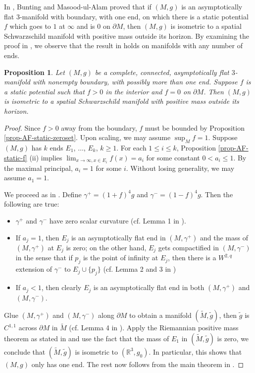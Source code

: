 \documentclass[12pt]{amsart}
\newtheorem{prop}{Proposition}[section]
\theoremstyle{remark}
\numberwithin{equation}{section}
\newcommand{\R}{\mathbb R}
\def\p{\partial}
\begin{document}
In \cite{Bunting-Masood}, Bunting and Masood-ul-Alam  proved that if $(M,g)$ is an
asymptotically flat $3$-manifold with  boundary, with one end,  
on which there is  a static potential  $f $ which goes to $1$ at $\infty$ and is $0$  on $\p M$,
 then $(M, g)$ is isometric to a spatial Schwarzschild manifold with positive mass outside its horizon.
  By examining the proof in \cite{Bunting-Masood}, we observe that the result in \cite{Bunting-Masood} holds on  manifolds with any number of ends.

\begin{prop}\label{prop-B-M}
Let $(M,g)$ be a complete, connected, asymptotically flat $3$-manifold with nonempty   boundary, with possibly more than one end.
Suppose $ f$ is a static potential  such that $f>0$ in the interior and  $f=0$ on $\p M$. Then
$(M, g)$ is isometric to a spatial Schwarzschild manifold with positive mass outside its horizon.
\end{prop}

\begin{proof}
Since $f > 0 $ away from the boundary,  $f$ must be  bounded by Proposition \ref{prop-AF-static-zeroset}.
Upon scaling, we may assume $\sup_M f=1$.
Suppose $(M, g)$ has $k$ ends $E_1$, $\ldots$, $E_k$, $k \ge 1$.
For each $ 1 \le i \le k$,  Proposition \ref{prop-AF-static-f} (ii) implies $\lim_{x\to\infty, x\in E_i}f(x)=a_i$ for some constant $0<a_i\le 1$.
By the maximal principal,  $a_i = 1 $ for some $i$. Without losing generality, we  may  assume  $a_1=1$.


We proceed as in \cite{Bunting-Masood}.  Define  $\gamma^{+}=(1+f)^4g$ and $\gamma^{-}=(1-f)^4g$.
Then the following are true:
\begin{itemize}
\item  $\gamma^+$ and $\gamma^-$ have zero scalar curvature (cf. Lemma 1 in \cite{Bunting-Masood}).

\item If $ a_j = 1$, then $E_j$ is an asymptotically flat end in  $(M, \gamma^+)$ and the  mass of $(M, \gamma^+)$ at $E_j$ is zero;
on the other hand, $E_j$ gets compactified in $(M, \gamma^-)$ in the sense that if $p_j$ is  the point of infinity at $E_j$, then there is a $W^{2, q}$  extension
of $\gamma^-$ to $E_j \cup \{ p_j \}$  (cf. Lemma 2 and 3 in \cite{Bunting-Masood})

\item If $ a_j < 1 $, then clearly $E_j$ is an asymptotically flat end in both $(M, \gamma^+)$ and $(M, \gamma^-)$.


\end{itemize}
Glue $(M, \gamma^+)$ and $(M, \gamma^-)$ along $\p M $ to obtain  a manifold   $(\tilde{M} , \tilde{g})$,
then $ \tilde{g}$ is $C^{1,1}$ across $\p M $ in $\tilde{M}$ (cf. Lemma 4 in \cite{Bunting-Masood}).
Apply the Riemannian positive mass theorem as stated in \cite[Theorem 1]{Bunting-Masood} and use the fact that the mass
of $E_1$ in $(\tilde{M}, \tilde{g})$ is zero, we conclude that $(\tilde{M}, \tilde{g})$ is isometric to $ (\R^3, g_0)$.
In particular, this shows that $(M, g)$ only has one end.
The rest now follows from the main theorem in \cite{Bunting-Masood}.
\end{proof}
\end{document}
